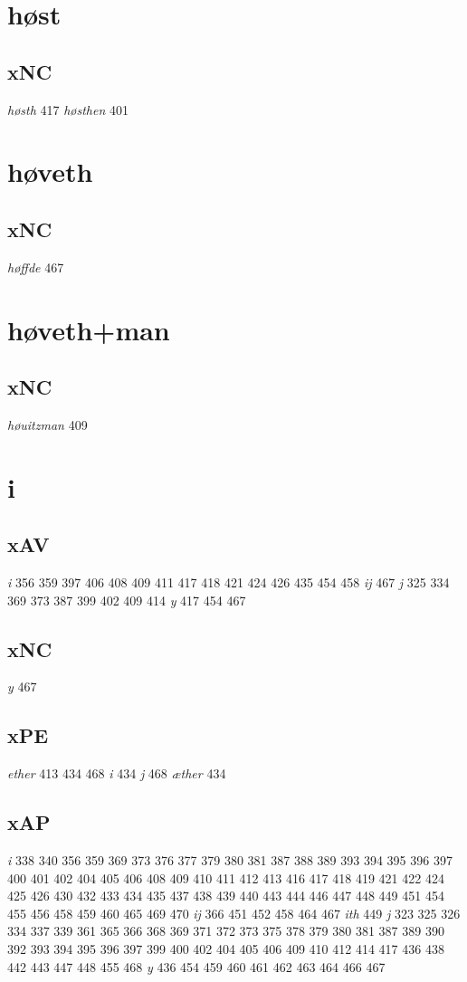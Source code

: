 \documentclass[a4paper,twocolumn]{article}
\begin{document}
\section{høst}
\label{sec:org41c99e6}
\subsection{xNC}
\label{sec:org6c2956d}
\emph{høsth} 417 \emph{høsthen} 401 
\section{høveth}
\label{sec:org79b1397}
\subsection{xNC}
\label{sec:org4eebebd}
\emph{høffde} 467 
\section{høveth+man}
\label{sec:org38421b9}
\subsection{xNC}
\label{sec:orgb732d8f}
\emph{høuitzman} 409 
\section{i}
\label{sec:org10afa5b}
\subsection{xAV}
\label{sec:orge8f38e7}
\emph{i} 356 359 397 406 408 409 411 417 418 421 424 426 435 454 458 \emph{ij} 467 \emph{j} 325 334 369 373 387 399 402 409 414 \emph{y} 417 454 467 
\subsection{xNC}
\label{sec:orgb4edb5b}
\emph{y} 467 
\subsection{xPE}
\label{sec:orgb7540b1}
\emph{ether} 413 434 468 \emph{i} 434 \emph{j} 468 \emph{æther} 434 
\subsection{xAP}
\label{sec:orgc96ad27}
\emph{i} 338 340 356 359 369 373 376 377 379 380 381 387 388 389 393 394 395 396 397 400 401 402 404 405 406 408 409 410 411 412 413 416 417 418 419 421 422 424 425 426 430 432 433 434 435 437 438 439 440 443 444 446 447 448 449 451 454 455 456 458 459 460 465 469 470 \emph{ij} 366 451 452 458 464 467 \emph{ith} 449 \emph{j} 323 325 326 334 337 339 361 365 366 368 369 371 372 373 375 378 379 380 381 387 389 390 392 393 394 395 396 397 399 400 402 404 405 406 409 410 412 414 417 436 438 442 443 447 448 455 468 \emph{y} 436 454 459 460 461 462 463 464 466 467 
\end{document}
